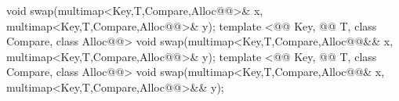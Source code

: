 \documentclass[american,twoside]{book}
\begin{document}
\begin{codeblock}
{    void swap(multimap<Key,T,Compare,Alloc@@>& x,
              multimap<Key,T,Compare,Alloc@@>& y);
  template <@@ Key, @@ T, class Compare, class Alloc@@>
    void swap(multimap<Key,T,Compare,Alloc@@&& x,
              multimap<Key,T,Compare,Alloc@@>& y);
  template <@@ Key, @@ T, class Compare, class Alloc@@>
    void swap(multimap<Key,T,Compare,Alloc@@& x,
              multimap<Key,T,Compare,Alloc@@>&& y);
}
\end{codeblock}

%
\end{document}
